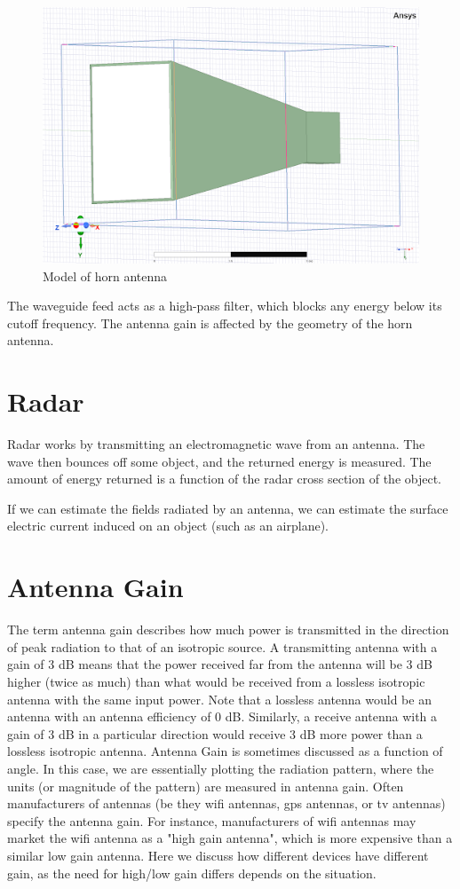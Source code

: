 \documentclass[a4paper,12pt]{report}
\begin{document}
\begin{figure}
  \begin{center}
    \includegraphics[clip, keepaspectratio, width=0.5\linewidth]{img/horn_antenna_model.png}
    \caption{Model of horn antenna}
    \label{fig:model_horn_antenna}
  \end{center}
\end{figure}

The waveguide feed acts as a high-pass filter,
which blocks any energy below its cutoff frequency.
The antenna gain is affected by the geometry of the horn antenna.

\section{Radar}

Radar works by transmitting an electromagnetic wave from an antenna.
The wave then bounces off some object, and the returned energy is measured.
The amount of energy returned is a function of the radar cross section of the object.

If we can estimate the fields radiated by an antenna,
we can estimate the surface electric current induced on an object
(such as an airplane).

\section{Antenna Gain}

The term antenna gain describes how much power is transmitted
in the direction of peak radiation to that of an isotropic source.
A transmitting antenna with a gain of 3 dB means that the power received
far from the antenna will be 3 dB higher (twice as much) than
what would be received from a lossless isotropic antenna with the
same input power. Note that a lossless antenna would be an antenna
with an antenna efficiency of 0 dB.
Similarly, a receive antenna with a gain of 3 dB in a particular direction
would receive 3 dB more power than a lossless isotropic antenna.
Antenna Gain is sometimes discussed as a function of angle.
In this case, we are essentially plotting the radiation pattern,
where the units (or magnitude of the pattern) are measured in antenna gain.
Often manufacturers of antennas
(be they wifi antennas, gps antennas, or tv antennas) specify the antenna gain.
For instance, manufacturers of wifi antennas may market the wifi antenna as a "high gain antenna",
which is more expensive than a similar low gain antenna.
Here we discuss how different devices have different gain,
as the need for high/low gain differs depends on the situation.
\end{document}

